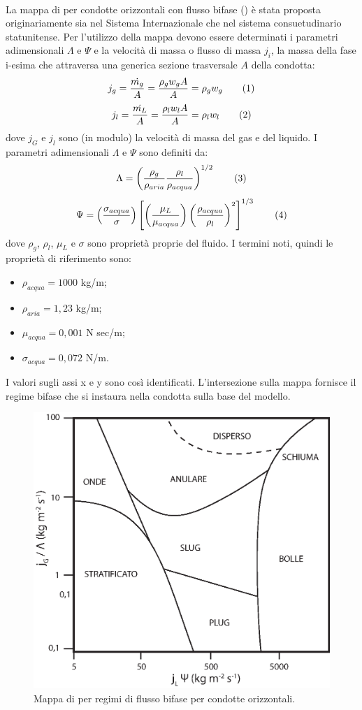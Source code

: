 \paragraph{\textcite{baker1954simultaneous}}
La mappa di \textcite{baker1954simultaneous} per condotte orizzontali con flusso bifase () è stata proposta originariamente sia nel Sistema Internazionale che nel sistema consuetudinario statunitense. Per l'utilizzo della mappa devono essere determinati i parametri adimensionali \(\Lambda\) e \(\Psi\) e la velocità di massa o flusso di massa \(j_i\), la massa della fase i-esima che attraversa una generica sezione trasversale \(A\) della condotta:
\[j_g = \frac{\dot{m_g}}{A}=\frac{\rho_g w_g A}{A}=\rho_g w_g \addtag\]
\[j_l = \frac{\dot{m_L}}{A}=\frac{\rho_l w_l A}{A}=\rho_l w_l \addtag\]
dove \(j_G\) e \(j_l\) sono (in modulo) la velocità di massa del gas e del liquido. I parametri adimensionali \(\Lambda\) e \(\Psi\) sono definiti da:
\[\Lambda= \left(\dfrac{\rho_g}{\rho_{aria}} \dfrac{\rho_l}{\rho_{acqua}}\right)^{1/2} \addtag \label{eq:lambdabaker} \]
\[\Psi=\left( \frac{\sigma_{acqua}}{\sigma} \right) \left[ \left( \frac{\mu_L}{\mu_{acqua}} \right) \left( \frac{\rho_{acqua}}{\rho_l} \right)^2 \right]^{1/3} \addtag \]
dove \(\rho_g\), \(\rho_l\), \(\mu_L\) e \(\sigma\) sono proprietà proprie del fluido. I termini noti, quindi le proprietà di riferimento sono:
\begin{itemize}
    \item \(\rho_{acqua}=1000\) kg/m;
    \item \(\rho_{aria}=1,23\) kg/m;
    \item \(\mu_{acqua}=0,001\) N sec/m;
    \item \(\sigma_{acqua}=0,072\) N/m.
\end{itemize}
I valori sugli assi x e y sono così identificati. L'intersezione sulla mappa fornisce il regime bifase che si instaura nella condotta sulla base del modello.
\begin{figure}[htbp]
    \centering
    \includegraphics[width=.6\textwidth]{fig/fluidodinamica/baker.eps}
    \caption{Mappa di \textcite{baker1954simultaneous} per regimi di flusso bifase per condotte orizzontali.}
    \label{fig:baker}
\end{figure}

